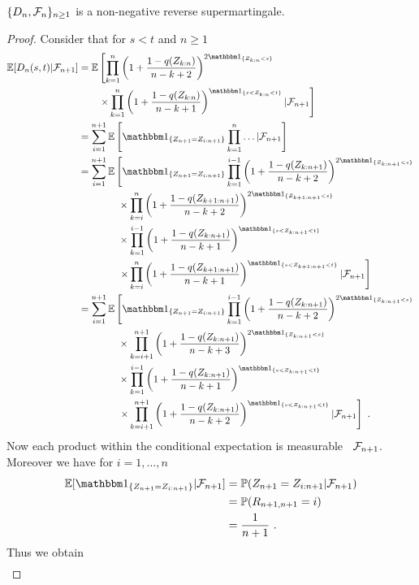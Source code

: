 %
\begin{lemma} \label{lem:dn_supermart}
	$\{D_n, \mathcal{F}_n\}_{n\geq 1}$ is a non-negative reverse supermartingale.
	\begin{proof}
		Consider that for $s<t$ and $n\geq 1$
		\begin{align*}
		\E[D_n(s,t)| \F_{n+1}] &= \E\left[\prod_{k=1}^{n}\left(1+\frac{1-q(Z_{k:n})}{n-k+2}\right)^{2\I{Z_{k:n} <s}}\right.\\
		&\qquad \left. \times \prod_{k=1}^{n}\left(1+\frac{1-q(Z_{k:n})}{n-k+1}\right)^\I{s < Z_{k:n} < t} | \F_{n+1}\right]\\
		&= \sum_{i=1}^{n+1}\E\left[\I{Z_{n+1} = Z_{i:n+1}} \prod_{k=1}^{n}\dots | \F_{n+1}\right]\\
		&= \sum_{i=1}^{n+1}\E\left[\I{Z_{n+1} = Z_{i:n+1}} \prod_{k=1}^{i-1}\left(1+\frac{1-q(Z_{k:n+1})}{n-k+2}\right)^{2\I{Z_{k:n+1} <s}} \right.\\
		&\qquad\qquad \times \prod_{k=i}^{n}\left(1+\frac{1-q(Z_{k+1:n+1})}{n-k+2}\right)^{2\I{Z_{k+1:n+1} <s}}\\
		&\qquad\qquad \times \prod_{k=1}^{i-1}\left(1+\frac{1-q(Z_{k:n+1})}{n-k+1}\right)^\I{s < Z_{k:n+1} < t}\\
		&\qquad\qquad \left. \times \prod_{k=i}^{n}\left(1+\frac{1-q(Z_{k+1:n+1})}{n-k+1}\right)^\I{s < Z_{k+1:n+1} < t}| \F_{n+1}\right]\\
		&= \sum_{i=1}^{n+1}\E\left[\I{Z_{n+1} = Z_{i:n+1}} \prod_{k=1}^{i-1}\left(1+\frac{1-q(Z_{k:n+1})}{n-k+2}\right)^{2\I{Z_{k:n+1} <s}} \right.\\
		&\qquad\qquad \times \prod_{k=i+1}^{n+1}\left(1+\frac{1-q(Z_{k:n+1})}{n-k+3}\right)^{2\I{Z_{k:n+1} <s}}\\
		&\qquad\qquad \times \prod_{k=1}^{i-1}\left(1+\frac{1-q(Z_{k:n+1})}{n-k+1}\right)^\I{s < Z_{k:n+1} < t}\\
		&\qquad\qquad \left. \times \prod_{k=i+1}^{n+1}\left(1+\frac{1-q(Z_{k:n+1})}{n-k+2}\right)^\I{s < Z_{k:n+1} < t}| \F_{n+1}\right]\mdot
		\end{align*}
		Now each product within the conditional expectation is measurable \wrt\ $\mathcal{F}_{n+1}$. Moreover we have for $i=1,\dots,n$ 
		\begin{align*}
		\E[\I{Z_{n+1}=Z_{i:n+1}}|\F_{n+1}] &= \P(Z_{n+1}=Z_{i:n+1}|\F_{n+1})\\
		&= \P(R_{n+1,n+1} = i)\\
		&= \frac{1}{n+1}\mdot
		\end{align*}
		Thus we obtain
		\begin{align*}

\end{align*}
\end{proof}
\end{lemma}

